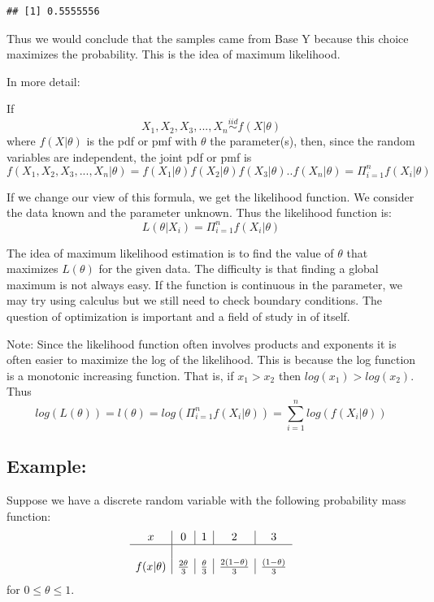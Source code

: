 \documentclass[]{book}
\theoremstyle{definition}
\theoremstyle{definition}
\theoremstyle{definition}
\theoremstyle{remark}
\begin{document}
\begin{verbatim}
## [1] 0.5555556
\end{verbatim}

Thus we would conclude that the samples came from Base Y because this
choice maximizes the probability. This is the idea of maximum
likelihood.

In more detail:

If \[X_{1},X_{2},X_{3},...,X_{n} \overset{iid}{\sim} f(X|\theta)\] where
\(f(X|\theta)\) is the pdf or pmf with \(\theta\) the parameter(s),
then, since the random variables are independent, the joint pdf or pmf
is
\[f(X_{1},X_{2},X_{3},...,X_{n}|\theta)= f(X_{1}|\theta)f(X_{2}|\theta)f(X_{3}|\theta)..f(X_{n}|\theta)=\Pi_{i=1}^{n}f(X_{i}|\theta)\]

If we change our view of this formula, we get the likelihood function.
We consider the data known and the parameter unknown. Thus the
likelihood function is:
\[L(\theta \vert X_{i})=\Pi_{i=1}^{n}f(X_{i}\vert \theta)\]

The idea of maximum likelihood estimation is to find the value of
\(\theta\) that maximizes \(L(\theta)\) for the given data. The
difficulty is that finding a global maximum is not always easy. If the
function is continuous in the parameter, we may try using calculus but
we still need to check boundary conditions. The question of optimization
is important and a field of study in of itself.

Note: Since the likelihood function often involves products and
exponents it is often easier to maximize the log of the likelihood. This
is because the log function is a monotonic increasing function. That is,
if \(x_{1}>x_{2}\) then \(log(x_{1})>log(x_{2})\). Thus
\[log(L(\theta))=l(\theta)=log\left( \Pi_{i=1}^{n}f(X_{i}|\theta)  \right)=\sum_{i=1}^{n}log(f(X_{i}|\theta))\]

\subsection{Example:}\label{example-2}

Suppose we have a discrete random variable with the following
probability mass function: \[
\begin{array}{c|c|c|c|c} 
x & 0 & 1 & 2 & 3 \\ \hline \\ f(x|\theta) & {2 \theta \over 3} & {\theta \over 3} & {2 (1 - \theta) \over 3} & {(1- \theta) \over 3}
\end{array} 
\] for \(0 \leq \theta \leq 1\).
\end{document}
